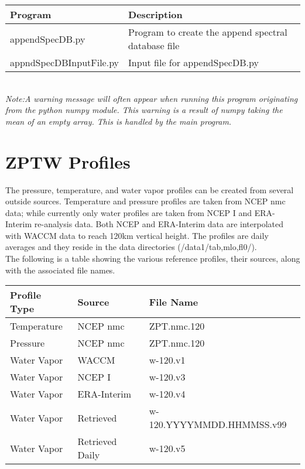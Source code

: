 \documentclass[12pt, letterpaper]{article}
\begin{document}
\begin{tabular}{ l l }
\textbf{Program} & \textbf{Description} \\
\hline
appendSpecDB.py         & Program to create the append spectral database file\\
appndSpecDBInputFile.py & Input file for appendSpecDB.py \\
\end{tabular} \\

\noindent \textit{Note:A warning message will often appear when running this program originating from the python numpy module. This warning is a result of numpy taking the mean of an empty array. This is handled by the main program.}

\section{ZPTW Profiles}
The pressure, temperature, and water vapor profiles can be created from several outside sources. Temperature and pressure profiles are taken from NCEP nmc data; while currently only water profiles are taken from NCEP I and ERA-Interim re-analysis data. Both NCEP and ERA-Interim data are interpolated with WACCM data to reach 120km vertical height. The profiles are daily averages and they reside in the data directories (/data1/tab,mlo,fl0/).\\

\noindent The following is a table showing the various reference profiles, their sources, along with the associated file names.\\

\begin{tabular}{ l l l }
\textbf{Profile Type} & \textbf{Source} & \textbf{File Name} \\
\hline
Temperature   & NCEP nmc          & ZPT.nmc.120 \\
Pressure      & NCEP nmc          & ZPT.nmc.120 \\
Water Vapor   & WACCM             & w-120.v1    \\
Water Vapor   & NCEP I            & w-120.v3    \\
Water Vapor   & ERA-Interim       & w-120.v4    \\
Water Vapor   & Retrieved         & w-120.YYYYMMDD.HHMMSS.v99    \\
Water Vapor   & Retrieved Daily   & w-120.v5    \\
\end{tabular} \\
\end{document}
